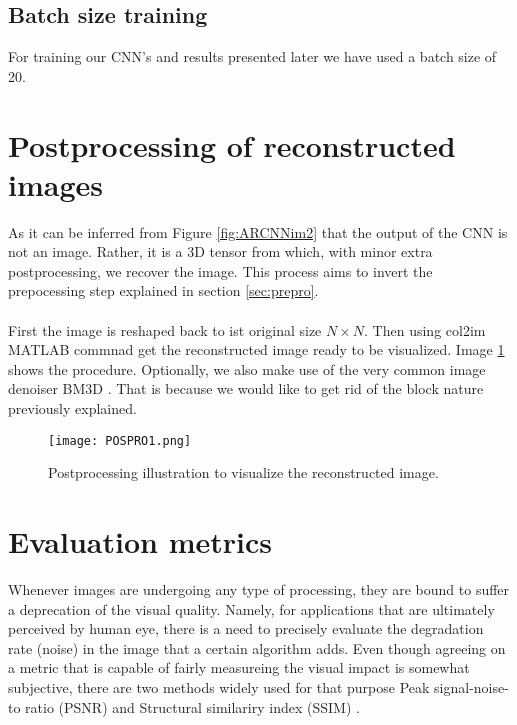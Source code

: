 \FloatBarrier

\subsection{Batch size training}  
For training our CNN's and results presented later we have used a batch size of 20. 

\FloatBarrier


\section{Postprocessing of reconstructed images}
As it can be inferred from Figure \ref{fig:ARCNNim2} that the output of the CNN is not an image. Rather, it is a 3D tensor from which, with minor extra postprocessing, we recover the image. This process aims to invert the prepocessing step explained in section \ref{sec:prepro}. \\\\

First the image is reshaped back to ist original size $N \times N$. Then using col2im MATLAB commnad get the reconstructed image ready to be visualized. Image \ref{fig:Posproim1} shows the procedure. Optionally, we also make use of the very common image denoiser BM3D \cite{dabov2007image}. That is because we would like to get rid of the block nature previously explained. 

\begin{figure}[tb] 
\centering 
\texttt{[image: POSPRO1.png]} 
\caption[Postprocessing of recovered images ]{Postprocessing illustration to visualize the reconstructed image.}
\label{fig:Posproim1} 
\end{figure}

\FloatBarrier

\section{Evaluation metrics}
Whenever images are undergoing any type of processing, they are bound to suffer a deprecation of the visual quality. Namely, for applications that are ultimately perceived by human eye, there is a need to precisely evaluate the degradation rate (noise) in the image that a certain algorithm adds. Even though agreeing on a metric that is capable of fairly measureing the visual impact is somewhat subjective, there are two methods widely used for that purpose Peak signal-noise-to ratio (PSNR) and Structural similariry index (SSIM) \cite{wang2004image}.     

